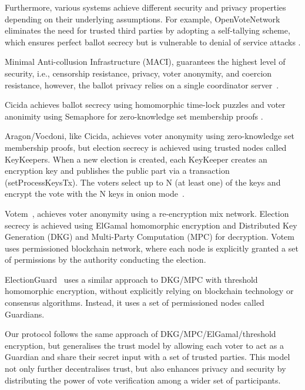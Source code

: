 \documentclass[runningheads]{llncs}
\begin{document}
Furthermore, various systems achieve different security and privacy properties depending on their underlying assumptions. For example, OpenVoteNetwork eliminates the need for trusted third parties by adopting a self-tallying scheme, which ensures perfect ballot secrecy but is vulnerable to denial of service attacks \cite{haoAnonymousVotingTworound2010, mccorrySmartContractBoardroom2017, seifelnasrScalableOpenVoteNetwork2020, elsheikhDisputefreeScalableOpen2022}.

Minimal Anti-collusion Infrastructure (MACI), guarantees the highest level of security, i.e., censorship resistance, privacy, voter anonymity, and coercion resistance, however, the ballot privacy relies on a single coordinator server~\cite{ethereumfoundationMinimalAntiCollusionInfrastructure2022, PrivacyscalingexplorationsMaci2023}.

Cicida achieves ballot secrecy using homomorphic time-lock puzzles and voter anonimity using Semaphore for zero-knowledge set membership proofs \cite{BuildingCicadaPrivate, A16zCicada2023}.

Aragon/Vocdoni, like Cicida, achieves voter anonymity using zero-knowledge set membership proofs, but election secrecy is achieved using trusted nodes called KeyKeepers. When a new election is created, each KeyKeeper creates an encryption key and publishes the public part via a transaction (setProcessKeysTx). The voters select up to N (at least one) of the keys and encrypt the vote with the N keys in onion mode~\cite{williamsRemoteVotingAge2022, VocdoniIntroductionVocdoni}. 

Votem~\cite{votemcorpVotemProofofvoteVotem}, achieves voter anonymity using a re-encryption mix network. Election secrecy is achieved using ElGamal homomorphic encryption and Distributed Key Generation (DKG) and Multi-Party Computation (MPC) for decryption. Votem uses permissioned blockchain network, where each node is explicitly granted a set of permissions by the authority conducting the election.

ElectionGuard~\cite{benalohElectionGuardDesignSpecification2023} uses a similar approach to DKG/MPC with threshold homomorphic encryption, without explicitly relying on blockchain technology or consensus algorithms. Instead, it uses a set of permissioned nodes called Guardians.

Our protocol follows the same approach of DKG/MPC/ElGamal/threshold encryption, but generalises the trust model by allowing each voter to act as a Guardian and share their secret input with a set of trusted parties. This model not only further decentralises trust, but also enhances privacy and security by distributing the power of vote verification among a wider set of participants. 
\end{document}
